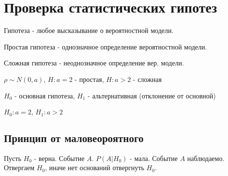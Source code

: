 \documentclass{article}
\begin{document}
\section{Проверка статистических гипотез}
\begin{definition}
  Гипотеза - любое высказывание о вероятностной модели.
\end{definition}
\begin{definition}
  Простая гипотеза - однозначное определение вероятностной модели.
\end{definition}
\begin{definition}
  Сложная гипотеза - неоднозначное определение вер. модели.
\end{definition}
$\rho \sim N(0,a)$, $H:a=2$ - простая, $H:a>2$ - сложная
\begin{definition}
  $H_0$ - основная гипотеза, $H_1$ - альтернативная (отклонение от основной)
\end{definition}
$H_0:a=2$, $H_1:a>2$

\subsection{Принцип от маловеороятного}
Пусть $H_0$ - верна. Событие $A$. $P(A|H_0)$ - мала. Событие $A$ наблюдаемо.
Отвергаем $H_0$, иначе нет оснований отвергнуть $H_0$.
\end{document}
